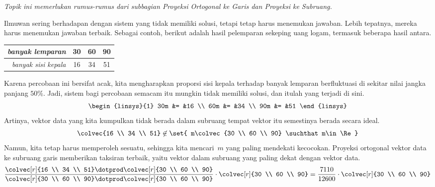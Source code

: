 \textit{Topik ini memerlukan rumus-rumus dari subbagian Proyeksi Ortogonal ke
        Garis dan Proyeksi ke Subruang.}

Ilmuwan sering berhadapan dengan sistem yang tidak memiliki solusi, tetapi tetap
harus menemukan jawaban. Lebih tepatnya, mereka harus menemukan jawaban terbaik.
Sebagai contoh, berikut adalah hasil pelemparan sekeping uang logam, termasuk
beberapa hasil antara.
\begin{center} \small
  \begin{tabular}{r|ccc}
     \textit{banyak lemparan}  &30  &60  &90   \\
     \hline
     \textit{banyak sisi kepala}  &16  &34  &51
  \end{tabular}
\end{center}
Karena percobaan ini bersifat acak, kita mengharapkan proporsi sisi kepala
terhadap banyak lemparan berfluktuasi di sekitar nilai jangka panjang $50\%$.
Jadi, sistem bagi percobaan semacam itu mungkin tidak memiliki solusi, dan
itulah yang terjadi di sini.
\begin{equation*}
  \begin{linsys}{1}
    30m  &=  &16    \\
    60m  &=  &34    \\
    90m  &=  &51
  \end{linsys}
\end{equation*}
Artinya, vektor data yang kita kumpulkan tidak berada dalam subruang tempat
vektor itu semestinya berada secara ideal.
\begin{equation*}
  \colvec{16 \\ 34 \\ 51}\not\in
    \set{ m\colvec{30 \\ 60 \\ 90}  \suchthat m\in\Re}
\end{equation*}
Namun, kita tetap harus memperoleh sesuatu, sehingga kita mencari~$m$ yang
paling mendekati kecocokan. Proyeksi ortogonal vektor data ke subruang garis
memberikan taksiran terbaik, yaitu vektor dalam subruang yang paling dekat dengan
vektor data.
\begin{equation*}
  \frac{ \colvec[r]{16 \\ 34 \\ 51}\dotprod\colvec[r]{30 \\ 60 \\ 90} }{
           \colvec[r]{30 \\ 60 \\ 90}\dotprod\colvec[r]{30 \\ 60 \\ 90} }
     \cdot\colvec[r]{30 \\ 60 \\ 90}
  =\frac{7110}{12600}\cdot \colvec[r]{30 \\ 60 \\ 90}
\end{equation*}
